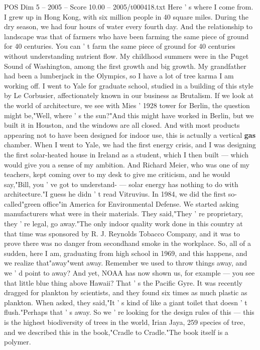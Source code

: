 \begin{textsample}{POS Dim 5 – 2005 – Score 10.00 – 2005/t000418.txt}
Here ' s where I come from.
I grew up in Hong Kong, with six million people in 40 square miles.
During the dry season, we had four hours of water every fourth day.
And the relationship to landscape was that of farmers who have been farming the same piece of ground for 40 centuries.
You can ' t farm the same piece of ground for 40 centuries without understanding nutrient flow.
My childhood summers were in the Puget Sound of Washington, among the first growth and big growth.
My grandfather had been a lumberjack in the Olympics, so I have a lot of tree karma I am working off.
I went to Yale for graduate school, studied in a building of this style by Le Corbusier, affectionately known in our business as Brutalism.
If we look at the world of architecture, we see with Mies ' 1928 tower for Berlin, the question might be,"Well, where ' s the sun?"And this might have worked in Berlin, but we built it in Houston, and the windows are all closed.
And with most products appearing not to have been designed for indoor use, this is actually a vertical \textbf{gas} chamber.
When I went to Yale, we had the first energy crisis, and I was designing the first solar-heated house in Ireland as a student, which I then built — which would give you a sense of my ambition.
And Richard Meier, who was one of my teachers, kept coming over to my desk to give me criticism, and he would say,"Bill, you ' ve got to understand- — solar energy has nothing to do with architecture."I guess he didn ' t read Vitruvius.
In 1984, we did the first so- called"green office"in America for Environmental Defense.
We started asking manufacturers what were in their materials.
They said,"They ' re proprietary, they ' re legal, go away."The only indoor quality work done in this country at that time was sponsored by R.
J.
Reynolds Tobacco Company, and it was to prove there was no danger from secondhand smoke in the workplace.
So, all of a sudden, here I am, graduating from high school in 1969, and this happens, and we realize that"away"went away.
Remember we used to throw things away, and we ' d point to away?
And yet, NOAA has now shown us, for example — you see that little blue thing above Hawaii?
That ' s the Pacific Gyre.
It was recently dragged for plankton by scientists, and they found six times as much plastic as plankton.
When asked, they said,"It ' s kind of like a giant toilet that doesn ' t flush."Perhaps that ' s away.
So we ' re looking for the design rules of this — this is the highest biodiversity of trees in the world, Irian Jaya, 259 species of tree, and we described this in the book,"Cradle to Cradle."The book itself is a polymer.

\end{textsample}
